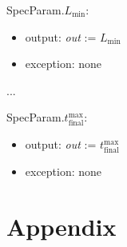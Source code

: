 \documentclass[12pt]{article}
\begin{document}
\noindent SpecParam.$L_\text{min}$:
\begin{itemize}
\item output: \textit{out} := $L_\text{min}$
\item exception: none
\end{itemize}

...
~\newline

\noindent SpecParam.$t_{\text{final}}^{\text{max}}$:
\begin{itemize}
\item output: \textit{out} := $t_{\text{final}}^{\text{max}}$
\item exception: none
\end{itemize}

\newpage
\section{Appendix} \label{Appendix}

\renewcommand{\arraystretch}{1.2}
\end{document}
